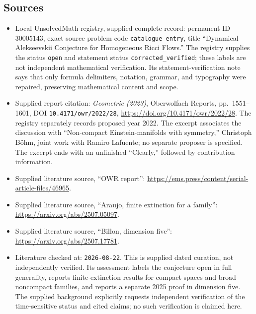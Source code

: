 \documentclass[11pt]{article}
\begin{document}
\subsection{Sources}
\begin{itemize}
\item Local UnsolvedMath registry, supplied complete record: permanent ID \(30005143\), exact source problem code \texttt{catalogue entry}, title ``Dynamical Alekseevskii Conjecture for Homogeneous Ricci Flows.'' The registry supplies the status \texttt{open} and statement status \texttt{corrected\_verified}; these labels are not independent mathematical verification. Its statement-verification note says that only formula delimiters, notation, grammar, and typography were repaired, preserving mathematical content and scope.
\item Supplied report citation: \emph{Geometrie (2023)}, Oberwolfach Reports, pp.\ 1551--1601, DOI \texttt{10.4171/owr/2022/28}, \url{https://doi.org/10.4171/owr/2022/28}. The registry separately records proposed year 2022. The excerpt associates the discussion with ``Non-compact Einstein-manifolds with symmetry,'' Christoph B\"ohm, joint work with Ramiro Lafuente; no separate proposer is specified. The excerpt ends with an unfinished ``Clearly,'' followed by contribution information.
\item Supplied literature source, ``OWR report'': \url{https://ems.press/content/serial-article-files/46965}.
\item Supplied literature source, ``Araujo, finite extinction for a family'': \url{https://arxiv.org/abs/2507.05097}.
\item Supplied literature source, ``Billon, dimension five'': \url{https://arxiv.org/abs/2507.17781}.
\item Literature checked at: \texttt{2026-08-22}. This is supplied dated curation, not independently verified. Its assessment labels the conjecture open in full generality, reports finite-extinction results for compact spaces and broad noncompact families, and reports a separate 2025 proof in dimension five. The supplied background explicitly requests independent verification of the time-sensitive status and cited claims; no such verification is claimed here.
\end{itemize}
\end{document}
